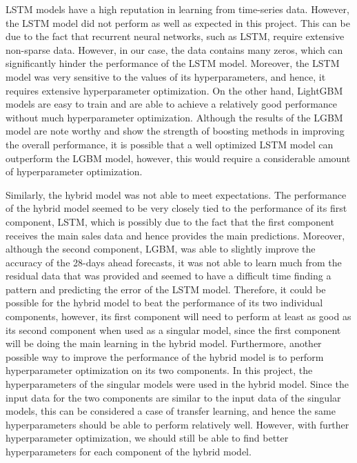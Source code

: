 LSTM models have a high reputation in learning from time-series data. 
However, the LSTM model did not perform as well as expected in this project.
This can be due to the fact that recurrent neural networks, such as LSTM, require extensive non-sparse data.
However, in our case, the data contains many zeros, which can significantly hinder the performance of the LSTM model.
Moreover, the LSTM model was very sensitive to the values of its hyperparameters, and hence, it requires extensive hyperparameter optimization.
On the other hand, LightGBM models are easy to train and are able to achieve a relatively good performance without much hyperparameter optimization.
Although the results of the LGBM model are note worthy and show the strength of boosting methods in improving the overall performance, it is possible that a well optimized LSTM model can outperform the LGBM model, however, this would require a considerable amount of hyperparameter optimization.

Similarly, the hybrid model was not able to meet expectations. 
The performance of the hybrid model seemed to be very closely tied to the performance of its first component, LSTM, which is possibly due to the fact that the first component receives the main sales data and hence provides the main predictions.
Moreover, although the second component, LGBM, was able to slightly improve the accuracy of the 28-days ahead forecasts, it was not able to learn much from the residual data that was provided and seemed to have a difficult time finding a pattern and predicting the error of the LSTM model.
Therefore, it could be possible for the hybrid model to beat the performance of its two individual components, however, its first component will need to perform at least as good as its second component when used as a singular model, since the first component will be doing the main learning in the hybrid model.
Furthermore, another possible way to improve the performance of the hybrid model is to perform hyperparameter optimization on its two components.
In this project, the hyperparameters of the singular models were used in the hybrid model.
Since the input data for the two components are similar to the input data of the singular models, this can be considered a case of transfer learning, and hence the same hyperparameters should be able to perform relatively well.
However, with further hyperparameter optimization, we should still be able to find better hyperparameters for each component of the hybrid model.

